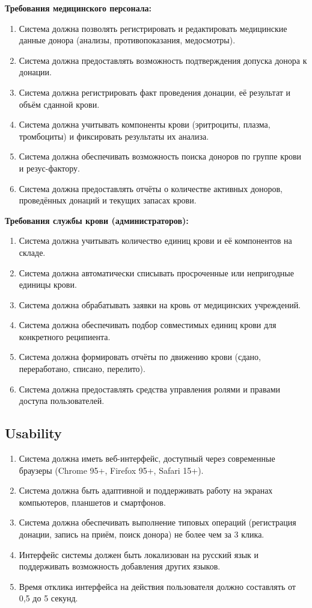 \documentclass[a4paper,12pt]{article}
\begin{document}
\textbf{Требования медицинского персонала:}

\begin{enumerate}[label=MF\arabic*]
  \item Система должна позволять регистрировать и редактировать медицинские данные донора (анализы, противопоказания, медосмотры).
  \item Система должна предоставлять возможность подтверждения допуска донора к донации.
  \item Система должна регистрировать факт проведения донации, её результат и объём сданной крови.
  \item Система должна учитывать компоненты крови (эритроциты, плазма, тромбоциты) и фиксировать результаты их анализа.
  \item Система должна обеспечивать возможность поиска доноров по группе крови и резус-фактору.
  \item Система должна предоставлять отчёты о количестве активных доноров, проведённых донаций и текущих запасах крови.
\end{enumerate}
  
\textbf{Требования службы крови (администраторов):}

\begin{enumerate}[label=OF\arabic*]
  \item Система должна учитывать количество единиц крови и её компонентов на складе.
  \item Система должна автоматически списывать просроченные или непригодные единицы крови.
  \item Система должна обрабатывать заявки на кровь от медицинских учреждений.
  \item Система должна обеспечивать подбор совместимых единиц крови для конкретного реципиента.
  \item Система должна формировать отчёты по движению крови (сдано, переработано, списано, перелито).
  \item Система должна предоставлять средства управления ролями и правами доступа пользователей.
\end{enumerate}

\subsection*{Usability}

\begin{enumerate}[label=U\arabic*]
  \item Система должна иметь веб-интерфейс, доступный через современные браузеры (Chrome 95+, Firefox 95+, Safari 15+).
  \item Система должна быть адаптивной и поддерживать работу на экранах компьютеров, планшетов и смартфонов.
  \item Система должна обеспечивать выполнение типовых операций (регистрация донации, запись на приём, поиск донора) не более чем за 3 клика.
  \item Интерфейс системы должен быть локализован на русский язык и поддерживать возможность добавления других языков.
  \item Время отклика интерфейса на действия пользователя должно составлять от 0,5 до 5 секунд.
\end{enumerate}
\end{document}

